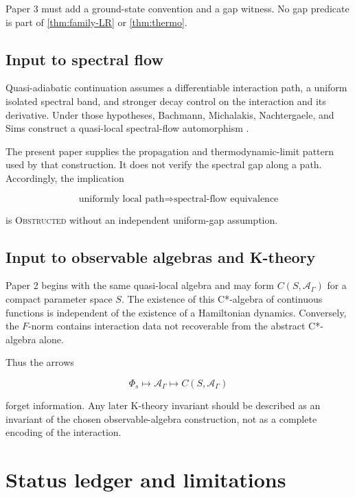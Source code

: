 \documentclass[12pt]{article}
\theoremstyle{definition}
\theoremstyle{remark}
\newcommand{\Alg}{\mathcal A}
\newcommand{\OBS}{\textsc{Obstructed}}
\begin{document}
Paper 3 must add a ground-state convention and a gap witness.  No gap
predicate is part of \cref{thm:family-LR} or \cref{thm:thermo}.

\subsection{Input to spectral flow}

Quasi-adiabatic continuation assumes a differentiable interaction path, a
uniform isolated spectral band, and stronger decay control on the interaction
and its derivative.  Under those hypotheses, Bachmann, Michalakis,
Nachtergaele, and Sims construct a quasi-local spectral-flow automorphism
\cite{BMNS2012}.

The present paper supplies the propagation and thermodynamic-limit pattern
used by that construction.  It does not verify the spectral gap along a path.
Accordingly, the implication

\begin{equation}
  \text{uniformly local path}
  \Longrightarrow
  \text{spectral-flow equivalence}
\end{equation}

is \OBS{} without an independent uniform-gap assumption.

\subsection{Input to observable algebras and K-theory}

Paper 2 begins with the same quasi-local algebra and may form
$C(S,\Alg_\Gamma)$ for a compact parameter space $S$.  The existence of this
C*-algebra of continuous functions is independent of the existence of a
Hamiltonian dynamics.  Conversely, the $F$-norm contains interaction data not
recoverable from the abstract C*-algebra alone.

Thus the arrows

\begin{equation}
  \Phi_s\longmapsto\Alg_\Gamma
  \longmapsto C(S,\Alg_\Gamma)
\end{equation}

forget information.  Any later K-theory invariant should be described as an
invariant of the chosen observable-algebra construction, not as a complete
encoding of the interaction.

\section{Status ledger and limitations}
\end{document}
